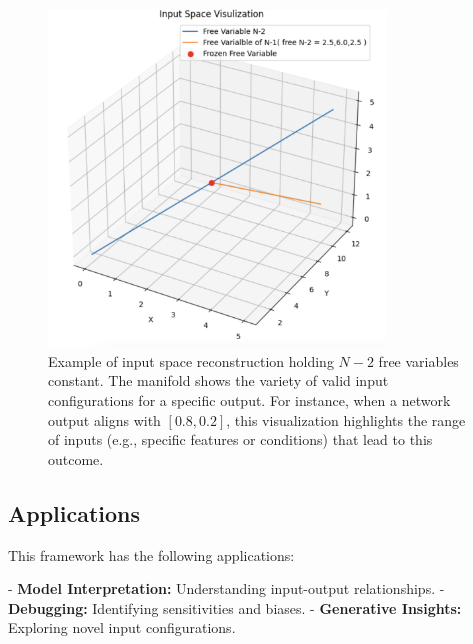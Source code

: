 \documentclass{article}
\begin{document}
\begin{figure}[h]
\centering
\includegraphics[width=0.8\textwidth]{InputVisulization.png}
\caption{Example of input space reconstruction holding \(N-2\) free variables constant. The manifold shows the variety of valid input configurations for a specific output. For instance, when a network output aligns with \([0.8, 0.2]\), this visualization highlights the range of inputs (e.g., specific features or conditions) that lead to this outcome.}
\end{figure}

\subsection*{Applications}

This framework has the following applications:

- \textbf{Model Interpretation:} Understanding input-output relationships.
- \textbf{Debugging:} Identifying sensitivities and biases.
- \textbf{Generative Insights:} Exploring novel input configurations.
\end{document}
